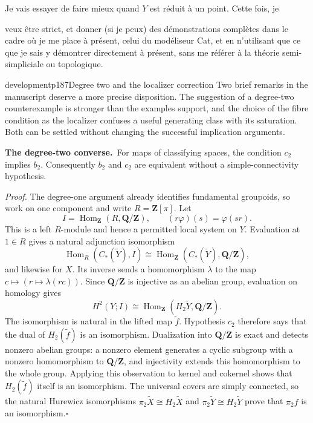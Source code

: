 Je vais essayer de faire mieux quand $Y$ est réduit à un point. Cette fois, je


veux être strict, et donner (si je peux) des démonstrations complètes dans le cadre où je me place à présent, celui du modéliseur Cat, et en n'utilisant que ce que je sais y démontrer directement à présent, sans me référer à la théorie semi-simpliciale ou topologique.

\begin{dcomment}{development}{p187}{Degree two and the localizer correction}
Two brief remarks in the manuscript deserve a more precise disposition. The suggestion of a degree-two counterexample is stronger than the examples support, and the choice of the fibre condition as the localizer confuses a useful generating class with its saturation. Both can be settled without changing the successful implication arguments.

\textbf{The degree-two converse.}\ours\ For maps of classifying spaces, the condition $c_2$ implies $b_2$. Consequently $b_2$ and $c_2$ are equivalent without a simple-connectivity hypothesis.

\textit{Proof.} The degree-one argument already identifies fundamental groupoids, so work on one component and write $R=\mathbf Z[\pi]$. Let
\[
 I=\operatorname{Hom}_{\mathbf Z}(R,\mathbf Q/\mathbf Z),
 \qquad (r\varphi)(s)=\varphi(sr).
\]
This is a left $R$-module and hence a permitted local system on $Y$. Evaluation at $1\in R$ gives a natural adjunction isomorphism
\[
 \operatorname{Hom}_R(C_*(\widetilde Y),I)
 \cong\operatorname{Hom}_{\mathbf Z}
                  (C_*(\widetilde Y),\mathbf Q/\mathbf Z),
\]
and likewise for $X$. Its inverse sends a homomorphism $\lambda$ to the map $c\mapsto(r\mapsto\lambda(rc))$. Since $\mathbf Q/\mathbf Z$ is injective as an abelian group, evaluation on homology gives
\[
 H^2(Y;I)\cong
 \operatorname{Hom}_{\mathbf Z}(H_2\widetilde Y,\mathbf Q/\mathbf Z).
\]
The isomorphism is natural in the lifted map $\widetilde f$. Hypothesis $c_2$ therefore says that the dual of $H_2(\widetilde f)$ is an isomorphism. Dualization into $\mathbf Q/\mathbf Z$ is exact and detects nonzero abelian groups: a nonzero element generates a cyclic subgroup with a nonzero homomorphism to $\mathbf Q/\mathbf Z$, and injectivity extends this homomorphism to the whole group. Applying this observation to kernel and cokernel shows that $H_2(\widetilde f)$ itself is an isomorphism. The universal covers are simply connected, so the natural Hurewicz isomorphisms $\pi_2\widetilde X\cong H_2\widetilde X$ and $\pi_2\widetilde Y\cong H_2\widetilde Y$ prove that $\pi_2f$ is an isomorphism.\hfill$\square$


\end{dcomment}
